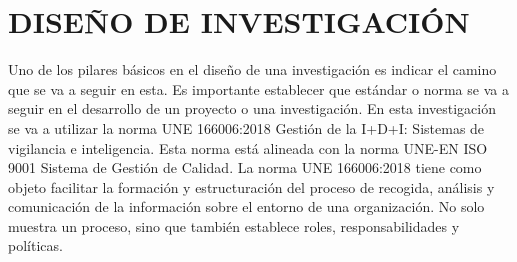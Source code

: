 \documentclass[spanish,12pt, a4paper,twoside]{paper}
\let\oldsection\section
\def\section{\cleardoublepage\oldsection}
\begin{document}
\section{DISEÑO DE INVESTIGACIÓN}
\justify
Uno de los pilares básicos en el diseño de una investigación es indicar el camino que se va a seguir en esta. Es importante establecer que estándar o norma se va a seguir en el desarrollo de un proyecto o una investigación. En esta investigación se va a utilizar la norma UNE 166006:2018 Gestión de la I+D+I: Sistemas de vigilancia e inteligencia. Esta norma está alineada con la norma UNE-EN ISO 9001 Sistema de Gestión de Calidad.
\justify
La norma UNE 166006:2018 tiene como objeto facilitar la formación y estructuración del proceso de recogida, análisis y comunicación de la información sobre el entorno de una organización. No solo muestra un proceso, sino que también establece roles, responsabilidades y políticas.
\end{document}
